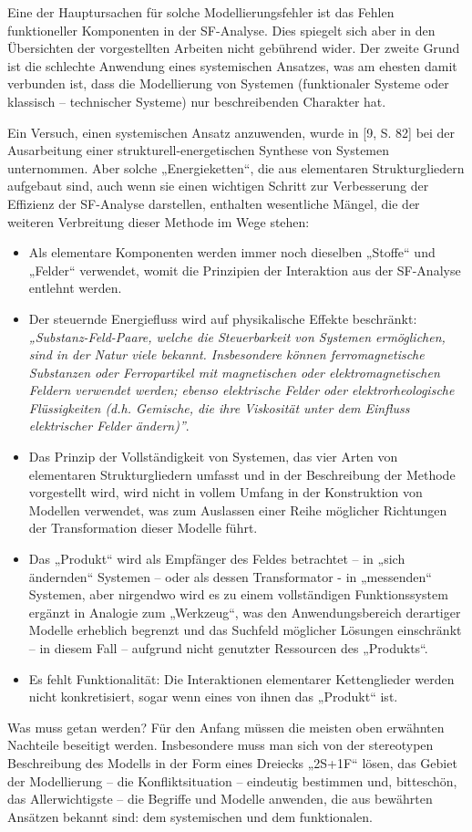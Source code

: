\documentclass[11pt,a4paper]{article}
\begin{document}
Eine der Hauptursachen für solche Modellierungsfehler ist das Fehlen
funktioneller Komponenten in der SF-Analyse. Dies spiegelt sich aber in den
Übersichten der vorgestellten Arbeiten nicht gebührend wider. Der zweite Grund
ist die schlechte Anwendung eines systemischen Ansatzes, was am ehesten damit
verbunden ist, dass die Modellierung von Systemen (funktionaler Systeme oder
klassisch -- technischer Systeme) nur beschreibenden Charakter hat.

Ein Versuch, einen systemischen Ansatz anzuwenden, wurde in [9, S. 82] bei der
Ausarbeitung einer strukturell-energetischen Synthese von Systemen
unternommen. Aber solche „Energieketten“, die aus elementaren Strukturgliedern
aufgebaut sind, auch wenn sie einen wichtigen Schritt zur Verbesserung der
Effizienz der SF-Analyse darstellen, enthalten wesentliche Mängel, die der
weiteren Verbreitung dieser Methode im Wege stehen:
\begin{itemize}
\item Als elementare Komponenten werden immer noch dieselben „Stoffe“ und
  „Felder“ verwendet, womit die Prinzipien der Interaktion aus der SF-Analyse
  entlehnt werden.
\item Der steuernde Energiefluss wird auf physikalische Effekte beschränkt:
  \emph{„Substanz-Feld-Paare, welche die Steuerbarkeit von Systemen
    ermöglichen, sind in der Natur viele bekannt. Insbesondere können
    ferromagnetische Substanzen oder Ferropartikel mit magnetischen oder
    elektromagnetischen Feldern verwendet werden; ebenso elektrische Felder
    oder elektrorheologische Flüssigkeiten (d.h. Gemische, die ihre Viskosität
    unter dem Einfluss elektrischer Felder ändern)”}.
\item Das Prinzip der Vollständigkeit von Systemen, das vier Arten von
  elementaren Strukturgliedern umfasst und in der Beschreibung der Methode
  vorgestellt wird, wird nicht in vollem Umfang in der Konstruktion von
  Modellen verwendet, was zum Auslassen einer Reihe möglicher Richtungen der
  Transformation dieser Modelle führt.
\item Das „Produkt“ wird als Empfänger des Feldes betrachtet -- in „sich
  ändernden“ Systemen -- oder als dessen Transformator - in „messenden“
  Systemen, aber nirgendwo wird es zu einem vollständigen Funktionssystem
  ergänzt in Analogie zum „Werkzeug“, was den Anwendungsbereich derartiger
  Modelle erheblich begrenzt und das Suchfeld möglicher Lösungen einschränkt
  -- in diesem Fall -- aufgrund nicht genutzter Ressourcen des „Produkts“.
\item Es fehlt Funktionalität: Die Interaktionen elementarer Kettenglieder
  werden nicht konkretisiert, sogar wenn eines von ihnen das „Produkt“ ist.
\end{itemize}
Was muss getan werden? Für den Anfang müssen die meisten oben erwähnten
Nachteile beseitigt werden. Insbesondere muss man sich von der stereotypen
Beschreibung des Modells in der Form eines Dreiecks „2S+1F“ lösen, das Gebiet
der Modellierung -- die Konfliktsituation -- eindeutig bestimmen und,
bitteschön, das Allerwichtigste -- die Begriffe und Modelle anwenden, die aus
bewährten Ansätzen bekannt sind: dem systemischen und dem funktionalen.
\end{document}
